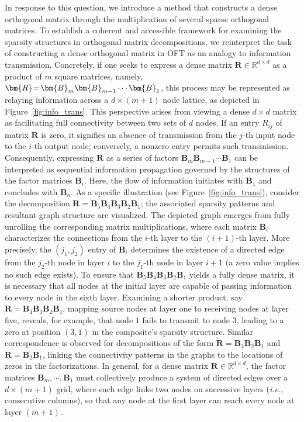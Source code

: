 In response to this question, we introduce a method that constructs a dense orthogonal matrix through the multiplication of several sparse orthogonal matrices. To establish a coherent and accessible framework for examining the sparsity structures in orthogonal matrix decompositions, we reinterpret the task of constructing a dense orthogonal matrix in OFT as an analogy to information transmission. Concretely, if one seeks to express a dense matrix $\bm{R}\in\mathbb{R}^{d\times d}$ as a product of $m$ square matrices, namely, $\thickmuskip=2mu \medmuskip=2mu \bm{R}=\bm{B}_m\bm{B}_{m-1}\cdots\bm{B}_1$, this process may be represented as relaying information across a $d\times (m+1)$ node lattice, as depicted in Figure~\ref{fig:info_trans}. This perspective arises from viewing a dense $d\times d$ matrix as facilitating full connectivity between two sets of $d$ nodes. If an entry $R_{ij}$ of matrix $\bm{R}$ is zero, it signifies an absence of transmission from the $j$-th input node to the $i$-th output node; conversely, a nonzero entry permits such transmission. Consequently, expressing $\bm{R}$ as a series of factors $\bm{B}_m\bm{B}_{m-1}\cdots\bm{B}_1$ can be interpreted as sequential information propagation governed by the structures of the factor matrices $\bm{B}_i$. Here, the flow of information initiates with $\bm{B}_1$ and concludes with $\bm{B}_n$. As a specific illustration (see Figure~\ref{fig:info_trans}), consider the decomposition $\bm{R}=\bm{B}_5\bm{B}_4\bm{B}_3\bm{B}_2\bm{B}_1$; the associated sparsity patterns and resultant graph structure are visualized. The depicted graph emerges from fully unrolling the corresponding matrix multiplications, where each matrix $\bm{B}_i$ characterizes the connections from the $i$-th layer to the $(i+1)$-th layer. More precisely, the $(j_1,j_2)$ entry of $\bm{B}_i$ determines the existence of a directed edge from the $j_2$-th node in layer $i$ to the $j_1$-th node in layer $i+1$ (a zero value implies no such edge exists). To ensure that $\bm{B}_5\bm{B}_4\bm{B}_3\bm{B}_2\bm{B}_1$ yields a fully dense matrix, it is necessary that all nodes at the initial layer are capable of passing information to every node in the sixth layer. Examining a shorter product, say $\bm{R}=\bm{B}_4\bm{B}_3\bm{B}_2\bm{B}_1$, mapping source nodes at layer one to receiving nodes at layer five, reveals, for example, that node $1$ fails to transmit to node $3$, leading to a zero at position $(3,1)$ in the composite's sparsity structure. Similar correspondence is observed for decompositions of the form $\bm{R}=\bm{B}_3\bm{B}_2\bm{B}_1$ and $\bm{R}=\bm{B}_2\bm{B}_1$, linking the connectivity patterns in the graphs to the locations of zeros in the factorizations. In general, for a dense matrix $\bm{R}\in\mathbb{R}^{d\times d}$, the factor matrices $\bm{B}_m,\cdots,\bm{B}_1$ must collectively produce a system of directed edges over a $d\times (m+1)$ grid, where each edge links two nodes on successive layers (\emph{i.e.}, consecutive columns), so that any node at the first layer can reach every node at layer $(m+1)$.

